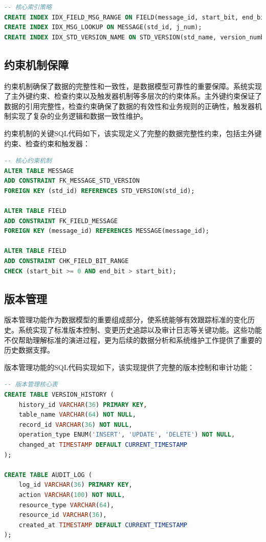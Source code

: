 \begin{lstlisting}[language=SQL, label=fig:database_indexes]
-- 核心索引策略
CREATE INDEX IDX_FIELD_MSG_RANGE ON FIELD(message_id, start_bit, end_bit);
CREATE INDEX IDX_MSG_LOOKUP ON MESSAGE(std_id, j_num);
CREATE INDEX IDX_STD_VERSION_NAME ON STD_VERSION(std_name, version_number);
\end{lstlisting}

\subsection{约束机制保障}

约束机制确保了数据的完整性和一致性，是数据模型可靠性的重要保障。系统实现了主外键约束、检查约束以及触发器机制等多层次的约束体系。主外键约束保证了数据的引用完整性，检查约束确保了数据的有效性和业务规则的正确性，触发器机制实现了复杂的业务逻辑和数据一致性维护。

约束机制的关键SQL代码如下，该实现定义了完整的数据完整性约束，包括主外键约束、检查约束和触发器：

\begin{lstlisting}[language=SQL, label=fig:database_constraints]
-- 核心约束机制
ALTER TABLE MESSAGE 
ADD CONSTRAINT FK_MESSAGE_STD_VERSION 
FOREIGN KEY (std_id) REFERENCES STD_VERSION(std_id);

ALTER TABLE FIELD 
ADD CONSTRAINT FK_FIELD_MESSAGE 
FOREIGN KEY (message_id) REFERENCES MESSAGE(message_id);

ALTER TABLE FIELD 
ADD CONSTRAINT CHK_FIELD_BIT_RANGE 
CHECK (start_bit >= 0 AND end_bit > start_bit);
\end{lstlisting}
\subsection{版本管理}
版本管理功能作为数据模型的重要组成部分，使系统能够有效跟踪标准的变化历史。系统实现了标准版本控制、变更历史追踪以及审计日志等关键功能。这些功能不仅帮助理解标准的演进过程，更为后续的数据分析和系统维护工作提供了重要的历史数据支撑。

版本管理功能的SQL代码实现如下，该实现提供了完整的版本控制和审计功能：

\begin{lstlisting}[language=SQL, label=fig:database_versioning]
-- 版本管理核心表
CREATE TABLE VERSION_HISTORY (
    history_id VARCHAR(36) PRIMARY KEY,
    table_name VARCHAR(64) NOT NULL,
    record_id VARCHAR(36) NOT NULL,
    operation_type ENUM('INSERT', 'UPDATE', 'DELETE') NOT NULL,
    changed_at TIMESTAMP DEFAULT CURRENT_TIMESTAMP
);

CREATE TABLE AUDIT_LOG (
    log_id VARCHAR(36) PRIMARY KEY,
    action VARCHAR(100) NOT NULL,
    resource_type VARCHAR(64),
    resource_id VARCHAR(36),
    created_at TIMESTAMP DEFAULT CURRENT_TIMESTAMP
);
\end{lstlisting}



